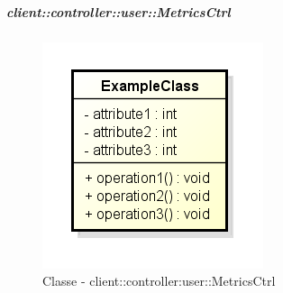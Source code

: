 		\subparagraph{client::controller::user::MetricsCtrl} %
		\label{subp:client_controller_user_metricsctrl}
			\begin{figure}[htbp]
				\centering
				\centerline{\includegraphics[scale=0.7]{./images/client/classes/example_class.png}}
				\caption{Classe - client::controller:user::MetricsCtrl}
			\end{figure}
